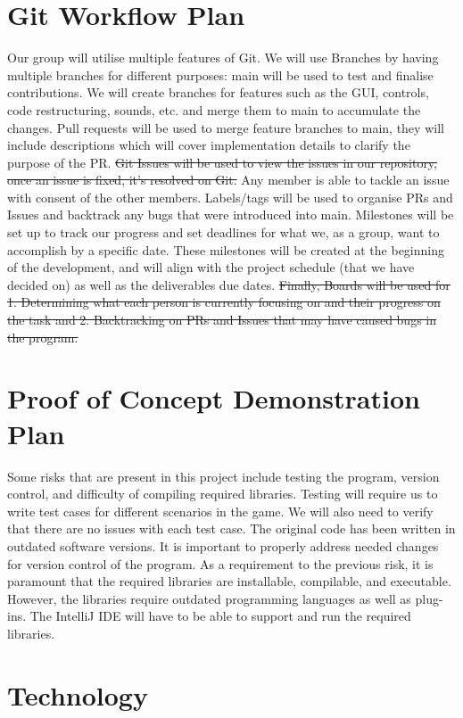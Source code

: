 \documentclass{article}
\begin{document}
\section{Git Workflow Plan}

Our group will utilise multiple features of Git. We will use Branches by having multiple branches for different purposes: main will be used to test and finalise contributions. We will create branches for features such as the GUI, controls, code restructuring, sounds, etc. and merge them to main to accumulate the changes. Pull requests will be used to merge feature branches to main, they will include descriptions which will cover implementation details to clarify the purpose of the PR. \st{Git Issues will be used to view the issues in our repository, once an issue is fixed, it’s resolved on Git.} Any member is able to tackle an issue with consent of the other members. Labels/tags will be used to organise PRs and Issues and backtrack any bugs that were introduced into main. Milestones will be set up to track our progress and set deadlines for what we, as a group, want to accomplish by a specific date. These milestones will be created at the beginning of the development, and will align with the project schedule (that we have decided on) as well as the deliverables due dates. \st{Finally, Boards will be used for 1. Determining what each person is currently focusing on and their progress on the task and 2. Backtracking on PRs and Issues that may have caused bugs in the program.}


\section{Proof of Concept Demonstration Plan}

Some risks that are present in this project include testing the program, version control, and difficulty of compiling required libraries. Testing will require us to write test cases for different scenarios in the game. We will also need to verify that there are no issues with each test case. The original code has been written in outdated software versions. It is important to properly address needed changes for version control of the program. As a requirement to the previous risk, it is paramount that the required libraries are installable, compilable, and executable. However, the libraries require outdated programming languages as well as plug-ins. The IntelliJ IDE will have to be able to support and run the required libraries. 

\section{Technology}
\end{document}
